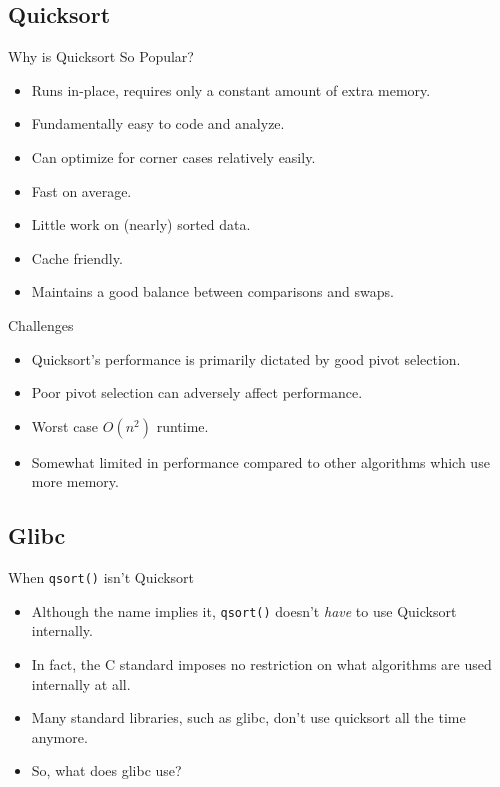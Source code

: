 \documentclass[13pt]{beamer}
\begin{document}
\subsection{Quicksort}
\begin{frame}{Why is Quicksort So Popular?}
	\pause
	\begin{itemize}[<+->]
		\item Runs in-place, requires only a constant amount of extra memory.
		\item Fundamentally easy to code and analyze.
		\item Can optimize for corner cases relatively easily.
		\item Fast on average.
		\item Little work on (nearly) sorted data.
		\item Cache friendly.
		\item Maintains a good balance between comparisons and swaps.
	\end{itemize}
\end{frame}

\begin{frame}{Challenges}
	\pause
	\begin{itemize}[<+->]
		\item Quicksort's performance is primarily dictated by good
		      pivot selection.
		\item Poor pivot selection can adversely affect performance.
		\item Worst case $O(n^{2})$ runtime.
		\item Somewhat limited in performance compared to other algorithms
		      which use more memory.
	\end{itemize}
\end{frame}

\subsection{Glibc}
\begin{frame}{When \texttt{qsort()} isn't Quicksort}
	\begin{itemize}[<+->]
		\item Although the name implies it, \texttt{qsort()} doesn't
		      \textit{have} to use Quicksort internally.
		\item In fact, the C standard imposes no restriction on what
		      algorithms are used internally at all.
		\item Many standard libraries, such as glibc, don't use quicksort
		      all the time anymore.
		\item So, what does glibc use?
	\end{itemize}
\end{frame}
\end{document}
